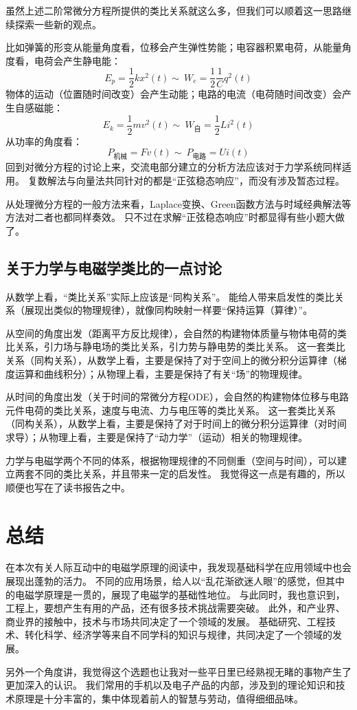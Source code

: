 \documentclass[UTF-8]{ctexart}
\begin{document}
虽然上述二阶常微分方程所提供的类比关系就这么多，但我们可以顺着这一思路继续探索一些新的观点。

比如弹簧的形变从能量角度看，位移会产生弹性势能；电容器积累电荷，从能量角度看，电荷会产生静电能：
$$
E_p=\frac{1}{2}kx^2(t)\sim\ W_e=\frac{1}{2}\frac{1}{C}q^2(t)
$$
物体的运动（位置随时间改变）会产生动能；电路的电流（电荷随时间改变）会产生自感磁能：
$$
E_k=\frac{1}{2}mv^2(t)\sim \ W_{\text{自}}=\frac{1}{2}Li^2(t)
$$
从功率的角度看：
$$
P_{\text{机械}}=Fv(t)\sim \ P_{\text{电路}}=Ui(t)
$$
回到对微分方程的讨论上来，交流电部分建立的分析方法应该对于力学系统同样适用。
复数解法与向量法共同针对的都是“正弦稳态响应”\cite{circuit}，而没有涉及暂态过程。

从处理微分方程的一般方法来看，Laplace变换、Green函数方法与时域经典解法等方法对二者也都同样奏效。
只不过在求解“正弦稳态响应”时都显得有些小题大做了。

\subsection{关于力学与电磁学类比的一点讨论}
从数学上看，“类比关系”实际上应该是“同构关系”。
能给人带来启发性的类比关系（展现出类似的物理规律），就像同构映射一样要“保持运算（算律）”。

从空间的角度出发（距离平方反比规律），会自然的构建物体质量与物体电荷的类比关系，引力场与静电场的类比关系，引力势与静电势的类比关系。
这一套类比关系（同构关系），从数学上看，主要是保持了对于空间上的微分积分运算律（梯度运算和曲线积分）；从物理上看，主要是保持了有关“场”的物理规律。

从时间的角度出发（关于时间的常微分方程ODE），会自然的构建物体位移与电路元件电荷的类比关系，速度与电流、力与电压等的类比关系。
这一套类比关系（同构关系），从数学上看，主要是保持了对于时间上的微分积分运算律（对时间求导）；从物理上看，主要是保持了“动力学”（运动）相关的物理规律。

力学与电磁学两个不同的体系，根据物理规律的不同侧重（空间与时间），可以建立两套不同的类比关系，并且带来一定的启发性。
我觉得这一点是有趣的，所以顺便也写在了读书报告之中。

\section{总结}
在本次有关人际互动中的电磁学原理的阅读中，我发现基础科学在应用领域中也会展现出蓬勃的活力。
不同的应用场景，给人以“乱花渐欲迷人眼”的感觉，但其中的电磁学原理是一贯的，展现了电磁学的基础性地位。
与此同时，我也意识到，工程上，要想产生有用的产品，还有很多技术挑战需要突破。
此外，和产业界、商业界的接触中，技术与市场共同决定了一个领域的发展。
基础研究、工程技术、转化科学、经济学等来自不同学科的知识与规律，共同决定了一个领域的发展。

另外一个角度讲，我觉得这个选题也让我对一些平日里已经熟视无睹的事物产生了更加深入的认识。
我们常用的手机以及电子产品的内部，涉及到的理论知识和技术原理是十分丰富的，集中体现着前人的智慧与劳动，值得细细品味。












\end{document}
